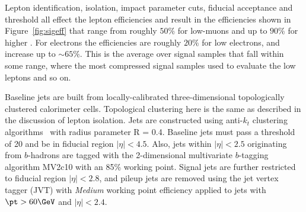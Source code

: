 Lepton identification, isolation, impact parameter cuts, fiducial acceptance and \pt threshold all effect the lepton efficiencies and result in the efficiencies shown in Figure~\ref{fig:sigeff} that range from roughly $50\%$ for low-\pt muons and up to $90\%$ for higher \pt.  For electrons the efficiencies are roughly $20\%$ for low \pt electrons, and increase up to $\sim65\%$.  This is the average over signal samples that fall within some range, where the most compressed signal samples used to evaluate the low \pt leptons and so on.

Baseline jets are built from locally-calibrated three-dimensional topologically clustered calorimeter cells.  Topological clustering here is the same as described in the discussion of lepton isolation.  Jets are constructed using anti-$k_t$ clustering algorithms~\cite{antikt} with radius parameter R = 0.4.   Baseline jets must pass a \pt{} threshold of 20 \GeV and be in fiducial region $|\eta | < 4.5$.   Also, jets within $|\eta | < 2.5$ originating from $b$-hadrons are tagged with the 2-dimensional multivariate $b$-tagging algorithm MV2c10 with an 85\% working point.  Signal jets are further restricted to fiducial region $|\eta | < 2.8$, and pileup jets are removed using the jet vertex tagger (JVT) with \textit{Medium} working point efficiency applied to jets with $\pt>60\GeV$ and $|\eta|<2.4$. 

